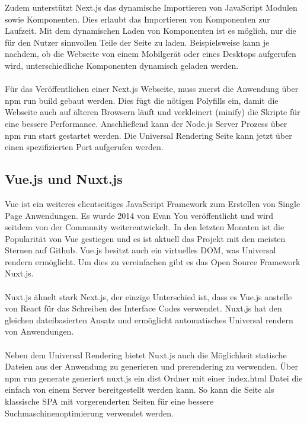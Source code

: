 \documentclass[runningheads]{llncs}
\begin{document}
Zudem unterstützt Next.js das dynamische Importieren von JavaScript Modulen sowie Komponenten. 
Dies erlaubt das Importieren von Komponenten zur Laufzeit. 
Mit dem dynamischen Laden von Komponenten ist es möglich, 
nur die für den Nutzer sinnvollen Teile der Seite zu laden. 
Beispielsweise kann je nachdem, 
ob die Webseite von einem Mobilgerät oder eines Desktops aufgerufen wird, 
unterschiedliche Komponenten dynamisch geladen werden. 
\\
\\
Für das Veröffentlichen einer Next.js Webseite, 
muss zuerst die Anwendung über npm run build gebaut werden. 
Dies fügt die nötigen Polyfills ein, 
damit die Webseite auch auf älteren Browsern läuft und 
verkleinert (minify) die Skripte für eine bessere Performance. 
Anschließend kann der Node.js Server Prozess über npm run start gestartet werden. 
Die Universal Rendering Seite kann jetzt über einen spezifizierten Port aufgerufen werden.

\subsection{Vue.js und Nuxt.js}
\label{subsec:Vue.js und Nuxt.js}
Vue ist ein weiteres clientseitiges JavaScript Framework zum Erstellen von Single Page Anwendungen. 
Es wurde 2014 von Evan You veröffentlicht und 
wird seitdem von der Community weiterentwickelt. 
In den letzten Monaten ist die Popularität von Vue gestiegen und 
es ist aktuell das Projekt mit den meisten Sternen auf Github. 
Vue.js besitzt auch ein virtuelles DOM, 
was Universal rendern ermöglicht. 
Um dies zu vereinfachen gibt es das Open Source Framework Nuxt.js.
\\
\\
Nuxt.js ähnelt stark Next.js, 
der einzige Unterschied ist, 
dass es Vue.js anstelle von React für das Schreiben des Interface Codes verwendet. 
Nuxt.js hat den gleichen dateibasierten Ansatz und ermöglicht automatisches Universal rendern von Anwendungen.
\\
\\
Neben dem Universal Rendering bietet Nuxt.js auch die Möglichkeit statische Dateien aus der Anwendung zu generieren und 
prerendering zu verwenden.
Über npm run generate generiert nuxt.js ein dist Ordner mit einer index.html Datei 
die einfach von einem Server bereitgestellt werden kann. 
So kann die Seite als klassische SPA mit vorgerenderten Seiten für eine bessere Suchmaschinenoptimierung verwendet werden.
\end{document}
